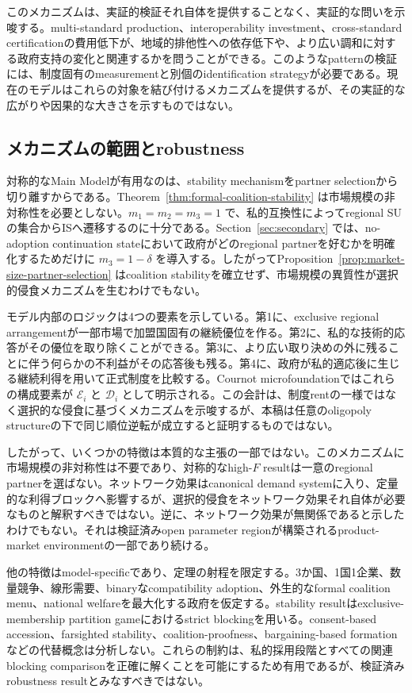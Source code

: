 このメカニズムは、実証的検証それ自体を提供することなく、実証的な問いを示唆する。multi-standard production、interoperability investment、cross-standard certificationの費用低下が、地域的排他性への依存低下や、より広い調和に対する政府支持の変化と関連するかを問うことができる。このようなpatternの検証には、制度固有のmeasurementと別個のidentification strategyが必要である。現在のモデルはこれらの対象を結び付けるメカニズムを提供するが、その実証的な広がりや因果的な大きさを示すものではない。

\subsection{メカニズムの範囲とrobustness}
\label{subsec:discussion-scope}

対称的なMain Modelが有用なのは、stability mechanismをpartner selectionから切り離すからである。Theorem~\ref{thm:formal-coalition-stability} は市場規模の非対称性を必要としない。$m_1=m_2=m_3=1$ で、私的互換性によってregional SUの集合からISへ遷移するのに十分である。Section~\ref{sec:secondary} では、no-adoption continuation stateにおいて政府がどのregional partnerを好むかを明確化するためだけに $m_3=1-\delta$ を導入する。したがってProposition~\ref{prop:market-size-partner-selection} はcoalition stabilityを確立せず、市場規模の異質性が選択的侵食メカニズムを生むわけでもない。

モデル内部のロジックは4つの要素を示している。第1に、exclusive regional arrangementが一部市場で加盟国固有の継続優位を作る。第2に、私的な技術的応答がその優位を取り除くことができる。第3に、より広い取り決めの外に残ることに伴う何らかの不利益がその応答後も残る。第4に、政府が私的適応後に生じる継続利得を用いて正式制度を比較する。Cournot microfoundationではこれらの構成要素が $\mathscr E_i$ と $\mathscr D_i$ として明示される。この会計は、制度rentの一様ではなく選択的な侵食に基づくメカニズムを示唆するが、本稿は任意のoligopoly structureの下で同じ順位逆転が成立すると証明するものではない。

したがって、いくつかの特徴は本質的な主張の一部ではない。このメカニズムに市場規模の非対称性は不要であり、対称的なhigh-$F$ resultは一意のregional partnerを選ばない。ネットワーク効果はcanonical demand systemに入り、定量的な利得ブロックへ影響するが、選択的侵食をネットワーク効果それ自体が必要なものと解釈すべきではない。逆に、ネットワーク効果が無関係であると示したわけでもない。それは検証済みopen parameter regionが構築されるproduct-market environmentの一部であり続ける。

他の特徴はmodel-specificであり、定理の射程を限定する。3か国、1国1企業、数量競争、線形需要、binaryなcompatibility adoption、外生的なformal coalition menu、national welfareを最大化する政府を仮定する。stability resultはexclusive-membership partition gameにおけるstrict blockingを用いる。consent-based accession、farsighted stability、coalition-proofness、bargaining-based formationなどの代替概念は分析しない。これらの制約は、私的採用段階とすべての関連blocking comparisonを正確に解くことを可能にするため有用であるが、検証済みrobustness resultとみなすべきではない。


